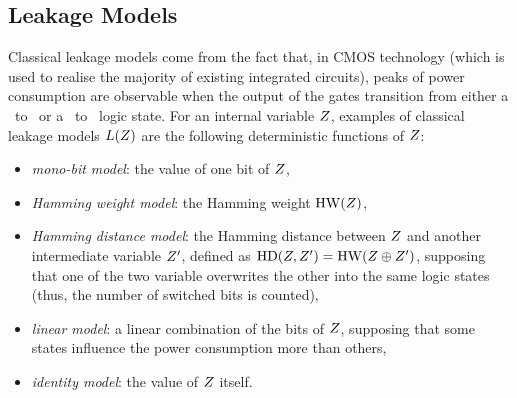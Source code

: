 \subsection{Leakage Models}\label{sec:leakage_models}
Classical leakage models come from the fact that, in CMOS technology (which is used to realise the majority of existing integrated circuits), peaks of power consumption are observable when the output of the gates transition from either a \textquotedbl \  to \textquotedbl \ or a \textquotedbl \ to \textquotedbl \ logic state.  For an internal variable $Z$, examples of classical leakage models $L(Z)$ are the following deterministic functions of $Z$:
\begin{itemize}
\item \emph{mono-bit model}: the value of one bit of $Z$,
\item\emph{Hamming weight model}: the Hamming weight $\mathrm{HW}(Z)$,
\item \emph{Hamming distance model}: the Hamming distance between $Z$ and another intermediate variable $Z^\prime$, defined as $\mathrm{HD}(Z,Z^\prime) = \mathrm{HW}(Z\oplus Z^\prime)$, supposing \eg that one of the two variable overwrites the other into the same logic states (thus, the number of switched bits is counted),
\item \emph{linear model}: a linear combination of the bits of $Z$, supposing that some states influence the power consumption more than others, 
\item \emph{identity model}: the value of $Z$ itself.
\end{itemize} 

